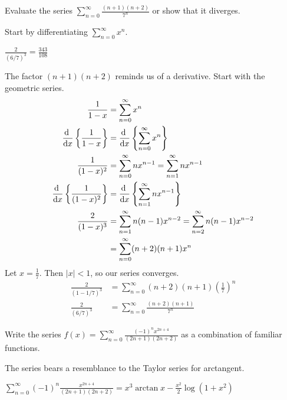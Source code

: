 \begin{Mquestion}
	Evaluate the series $\displaystyle\sum_{n=0}^\infty\frac{ (n+1)(n+2)}{7^n}$ or show that it diverges.
\end{Mquestion}
\begin{hint}
	Start by differentiating $\displaystyle\sum_{n=0}^\infty x^n$.
\end{hint}
\begin{answer}
	$\displaystyle\frac{2}{(6/7)^3}=\frac{343}{108}$
\end{answer}
\begin{solution}
The factor $(n+1)(n+2)$ reminds us of a derivative. Start with the geometric series.
\begin{align*}
	\frac{1}{1-x}&=\sum_{n=0}^\infty x^n\\
	\diff{}{x}\left\{\frac{1}{1-x} \right\}&=\diff{}{x}\left\{ \sum_{n=0}^\infty x^n  \right\}\\
	\frac{1}{(1-x)^2}&=\sum_{n=0}^\infty nx^{n-1}=\sum_{n=1}^\infty nx^{n-1}\\
	\diff{}{x}\left\{\frac{1}{(1-x)^2} \right\}&=\diff{}{x}\left\{ \sum_{n=1}^\infty nx^{n-1}  \right\}\\
	\frac{2}{(1-x)^3}&=\sum_{n=1}^\infty n(n-1)x^{n-2}=\sum_{n=2}^\infty n(n-1)x^{n-2}\\
	&=\sum_{n=0}^\infty (n+2)(n+1)x^n
	\end{align*}
	Let $x=\frac{1}{7}$. Then $|x|<1$, so our series converges.
	\begin{align*}
	\frac{2}{(1-1/7)^3}	&=\sum_{n=0}^\infty (n+2)(n+1)\left(\frac{1}{7}\right)^n\\
	\frac{2}{(6/7)^3}	&=\sum_{n=0}^\infty \frac{(n+2)(n+1)}{7^n}
	\end{align*}
\end{solution}
\begin{question}
	Write the series $f(x)=\displaystyle\sum_{n=0}^\infty\frac{(-1)^nx^{2n+4}}{(2n+1)(2n+2)}$ as a combination of familiar functions.
\end{question}
\begin{hint}
	The series bears a resemblance to the Taylor series for arctangent.
\end{hint}
\begin{answer}
	$\displaystyle  \sum_{n=0}^\infty (-1)^n\frac{x^{2n+4}}{(2n+1)(2n+2)}=x^3\arctan x - \frac{x^2}{2}\log(1+x^2)$
\end{answer}

